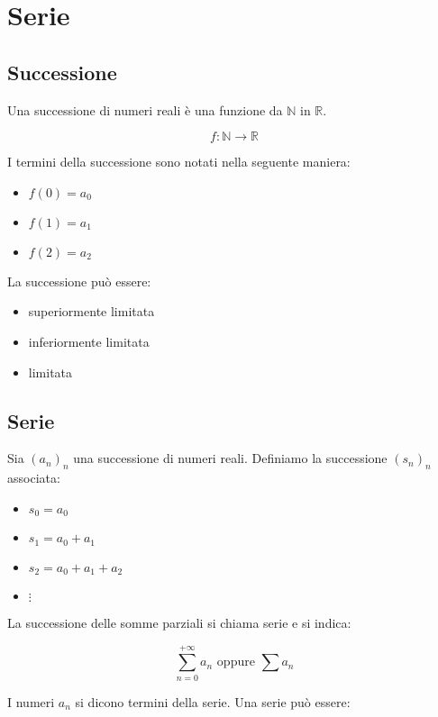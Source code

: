 \documentclass{article}
\begin{document}
\section{Serie}

\subsection{Successione}

Una successione di numeri reali è una funzione da $\mathbb{N}$ in $\mathbb{R}$.

$$
f: \mathbb{N} \to \mathbb{R}
$$

\noindent
I termini della successione sono notati nella seguente maniera:

\begin{itemize}
    \item $f(0) = a_0$
    \item $f(1) = a_1$
    \item $f(2) = a_2$
\end{itemize}

\noindent
La successione può essere:

\begin{itemize}
    \item superiormente limitata
    \item inferiormente limitata
    \item limitata
\end{itemize}


\subsection{Serie}

Sia $(a_n)_n$ una successione di numeri reali. Definiamo la successione $(s_n)_n$ associata:

\begin{itemize}
    \item $s_0 = a_0$
    \item $s_1 = a_0 + a_1$
    \item $s_2 = a_0 + a_1 + a_2$
    \item $\vdots$
\end{itemize}

\noindent
La successione delle somme parziali si chiama serie e si indica:

$$
\sum_{n = 0}^{+\infty} a_n \text{ oppure } \sum a_n
$$

\noindent
I numeri $a_n$ si dicono termini della serie. Una serie può essere:
\end{document}
